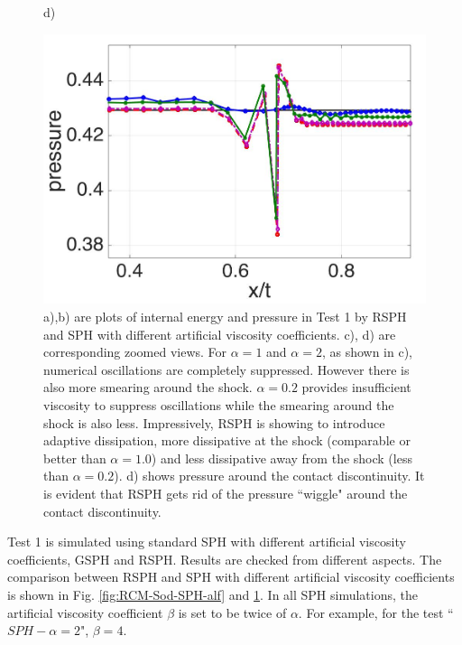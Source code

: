 \documentclass[review]{elsarticle}
\begin{document}
\begin{figure}[H]
\begin{minipage}{.45 \textwidth}
    \end{minipage}%
    \begin{minipage}{.545\textwidth}
    \centering d)
        \begin{flushleft}
        \includegraphics[width= 0.8174 \textwidth, height=0.5780 \textwidth]{./Figures/RCM-Sod-SPH-alf-p-zoom}    
        \end{flushleft}
    \end{minipage}%
    \caption{
    a),b) are plots of internal energy and pressure in Test 1 by RSPH and SPH with different artificial viscosity coefficients.  c), d) are corresponding zoomed views. For $\alpha=1$ and $\alpha=2$, as shown in c), numerical oscillations are completely suppressed. However there is also more smearing around the shock. $\alpha=0.2$ provides insufficient viscosity to suppress oscillations while the smearing around the shock is also less. Impressively, RSPH is showing to introduce adaptive dissipation, more dissipative at the shock (comparable or better than $\alpha=1.0$) and less dissipative away from the shock (less than $\alpha=0.2$). d) shows pressure around the contact discontinuity. It is evident that RSPH gets rid of the pressure ``wiggle" around the contact discontinuity.}
    \label{fig:RCM-Sod-SPH-alf-zoom}
\end{figure}

Test 1 is simulated using standard SPH with different artificial viscosity coefficients, GSPH and RSPH. Results are checked from different aspects.  
The comparison between RSPH and SPH with different artificial viscosity coefficients is shown in Fig. \ref{fig:RCM-Sod-SPH-alf} and \ref{fig:RCM-Sod-SPH-alf-zoom}. In all SPH simulations, the artificial viscosity coefficient $\beta$ is set to be twice of $\alpha$. For example, for the test ``$SPH-\alpha=2$", $\beta=4$.
\end{document}
